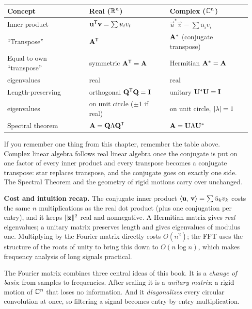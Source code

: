 \begin{center}
\begin{tabular}{@{}lll@{}}
\toprule
\textbf{Concept} & \textbf{Real ($\mathbb{R}^n$)} & \textbf{Complex ($\mathbb{C}^n$)}\\
\midrule
Inner product & $\mathbf{u}^{\mathsf{T}}\mathbf{v}=\sum u_iv_i$ & $\vec u^{*}\vec v=\sum\bar u_iv_i$\\
``Transpose'' & $\mathbf{A}^{\mathsf{T}}$ & $\mathbf{A}^{*}$ (conjugate transpose)\\
Equal to own ``transpose'' & symmetric $\mathbf{A}^{\mathsf{T}}=\mathbf{A}$ & Hermitian $\mathbf{A}^{*}=\mathbf{A}$\\
\quad eigenvalues & real & real\\
Length-preserving & orthogonal $\mathbf{Q}^{\mathsf{T}}\mathbf{Q}=\mathbf{I}$ & unitary $\mathbf{U}^{*}\mathbf{U}=\mathbf{I}$\\
\quad eigenvalues & on unit circle ($\pm 1$ if real) & on unit circle, $\lvert\lambda\rvert=1$\\
Spectral theorem & $\mathbf{A}=\mathbf{Q}\Lambda\mathbf{Q}^{\mathsf{T}}$ & $\mathbf{A}=\mathbf{U}\Lambda\mathbf{U}^{*}$\\
\bottomrule
\end{tabular}
\end{center}

\begin{focusbox}
If you remember one thing from this chapter, remember the table above. Complex
linear algebra follows real linear algebra once the conjugate is put on one factor
of every inner product and every transpose becomes a conjugate transpose: star
replaces transpose, and the conjugate goes on exactly one side. The Spectral
Theorem and the geometry of rigid motions carry over unchanged.
\end{focusbox}

\begin{recoverybox}
\textbf{Cost and intuition recap.} The conjugate inner product
$\langle \mathbf{u},\, \mathbf{v} \rangle=\sum\bar u_kv_k$ costs the same $n$ multiplications as the
real dot product (plus one conjugation per entry), and it keeps
$\lVert\mathbf{z}\rVert^2$ real and nonnegative. A Hermitian
matrix gives \emph{real} eigenvalues; a unitary matrix preserves length and gives
eigenvalues of modulus one. Multiplying by the Fourier matrix directly costs $O(n^2)$;
the FFT uses the structure of the roots of unity to bring this down to
$O(n\log n)$, which makes frequency analysis of long signals practical.
\end{recoverybox}

\begin{aestheticbox}
The Fourier matrix combines three central ideas of this book. It is
a \emph{change of basis}: from samples to frequencies. After scaling it is a
\emph{unitary matrix}: a rigid motion of $\mathbb{C}^n$ that loses no information. And it
\emph{diagonalizes} every circular convolution at once, so filtering a signal
becomes entry-by-entry multiplication.
\end{aestheticbox}

